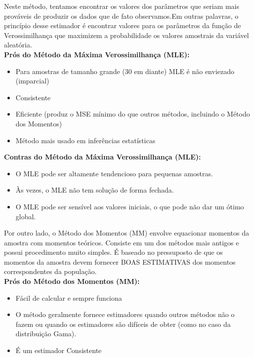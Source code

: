 Neste método, tentamos encontrar os valores dos parâmetros que seriam mais prováveis de produzir os dados que de fato observamos.Em outras palavras, o princípio desse estimador é encontrar valores para os parâmetros da função de Verossimilhança que maximizem a probabilidade os valores amostrais da variável aleatória.\\

\textbf{Prós do Método da Máxima Verossimilhança (MLE):}

\begin{itemize}
\item Para amostras de tamanho grande (30 em diante) MLE é não enviezado (imparcial)
\item Consistente
\item Eficiente (produz o MSE mínimo do que outros métodos, incluindo o Método dos Momentos)
\item Método mais usado em inferências estatísticas
\end{itemize}

\textbf{Contras do Método da Máxima Verossimilhança (MLE):}

\begin{itemize}
\item O MLE pode ser altamente tendencioso para pequenas amostras.
\item Às vezes, o MLE não tem solução de forma fechada.
\item O MLE pode ser sensível aos valores iniciais, o que pode não dar um ótimo global.
\end{itemize}

Por outro lado, o Método dos Momentos (MM) envolve equacionar momentos da amostra com momentos teóricos. Consiste em um dos métodos mais antigos e possui procedimento muito simples. É baseado no pressuposto de que os momentos da amostra devem fornecer BOAS ESTIMATIVAS dos momentos correspondentes da população.\\

\textbf{Prós do Método dos Momentos (MM):}

\begin{itemize}
\item Fácil de calcular e sempre funciona
\item O método geralmente fornece estimadores quando outros métodos não o fazem ou quando os estimadores são difíceis de obter (como no caso da distribuição Gama).
\item É um estimador Consistente
\end{itemize}

